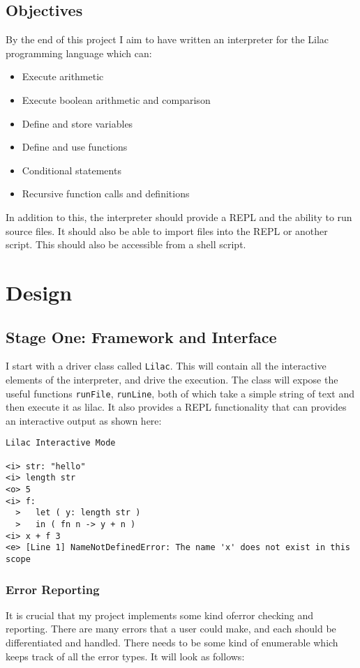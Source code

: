 \documentclass[a4paper, 12pt]{article}
\begin{document}
\subsection{Objectives}\label{sec:objectives}
By the end of this project I aim to have written an interpreter for the Lilac programming language which can:\\
\begin{itemize}
\item 
Execute arithmetic
\item 
Execute boolean arithmetic and comparison
\item 
Define and store variables
\item
Define and use functions
\item 
Conditional statements
\item 
Recursive function calls and definitions
\end{itemize}

In addition to this, the interpreter should provide a REPL and the ability to run source files. It should also be able to import files into the REPL or another script. This should also be accessible from a shell script.

\section{Design}\label{sec:design}
\subsection{Stage One: Framework and Interface}\label{sec:stage-one-framework-and-interface}
I start with a driver class called \verb|Lilac|. This will contain all the interactive elements of the interpreter, and drive the execution. The class will expose the useful functions \verb|runFile|, \verb|runLine|, both of which take a simple string of text and then execute it as lilac. It also provides a REPL functionality that can provides an interactive output as shown here:\\
\begin{verbatim}
Lilac Interactive Mode

<i> str: "hello"
<i> length str
<o> 5
<i> f:
  >   let ( y: length str )
  >   in ( fn n -> y + n )
<i> x + f 3
<e> [Line 1] NameNotDefinedError: The name 'x' does not exist in this scope
\end{verbatim}
\subsubsection{Error Reporting}\label{sec:error-reporting}
It is crucial that my project implements some kind oferror checking and reporting. There are many errors that a user could make, and each should be differentiated and handled. There needs to be some kind of enumerable which keeps track of all the error types. It will look as follows:\\
\end{document}
